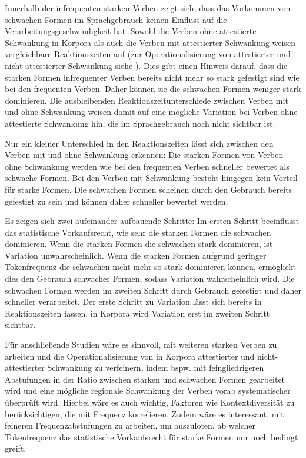 Innerhalb der infrequenten starken Verben zeigt sich, dass das Vorkommen von schwachen Formen im Sprachgebrauch keinen Einfluss auf die Verarbeitungsgeschwindigkeit hat. Sowohl die Verben ohne attestierte Schwankung in Korpora als auch die Verben mit attestierter Schwankung weisen vergleichbare Reaktionszeiten auf (zur Operationalisierung von attestierter und nicht-at\-tes\-tier\-ter Schwankung siehe ). Dies gibt einen Hinweis darauf, dass die starken Formen infrequenter Verben bereits nicht mehr so stark gefestigt sind wie bei den frequenten Verben. Daher können sie die schwachen Formen weniger stark dominieren. Die ausbleibenden Reaktionszeitunterschiede zwischen Verben mit und ohne Schwankung weisen damit auf eine mögliche Variation bei Verben ohne attestierte Schwankung hin, die im Sprachgebrauch noch nicht sichtbar ist.

 
Nur ein kleiner Unterschied in den Reaktionszeiten lässt sich zwischen den Verben mit und ohne Schwankung erkennen: Die starken Formen von Verben ohne Schwankung werden wie bei den frequenten Verben schneller bewertet als schwache Formen. Bei den Verben mit Schwankung besteht hingegen kein Vorteil für starke Formen. Die schwachen Formen scheinen durch den Gebrauch bereits gefestigt zu sein und können daher schneller bewertet werden.

 
Es zeigen sich zwei aufeinander aufbauende Schritte: Im ersten Schritt beeinflusst das statistische Vorkaufsrecht, wie sehr die starken Formen die schwachen dominieren. Wenn die starken Formen die schwachen stark dominieren, ist Variation unwahrscheinlich. Wenn die starken Formen aufgrund geringer Tokenfrequenz die schwachen nicht mehr so stark dominieren können, ermöglicht dies den Gebrauch schwacher Formen, sodass Variation wahrscheinlich wird. Die schwachen Formen werden im zweiten Schritt durch Gebrauch gefestigt und daher schneller verarbeitet. Der erste Schritt zu Variation lässt sich bereits in Re\-ak\-tions\-zei\-ten fassen, in Korpora wird Variation erst im zweiten Schritt sichtbar.

Für anschließende Studien wäre es sinnvoll, mit weiteren starken Verben zu arbeiten und die Operationalisierung von in Korpora attestierter und nicht-at\-tes\-tier\-ter Schwankung zu verfeinern, indem bspw. mit feingliedrigeren Abstufungen in der Ratio zwischen starken und schwachen Formen gearbeitet wird und eine mögliche regionale Schwankung der Verben vorab systematischer überprüft wird. Hierbei wäre es auch wichtig, Faktoren wie Kontextdiversität zu berücksichtigen, die mit Frequenz korrelieren. Zudem wäre es interessant, mit feineren Frequenzabstufungen zu arbeiten, um auszuloten, ab welcher Tokenfrequenz das statistische Vorkaufsrecht für starke Formen nur noch bedingt greift.   



